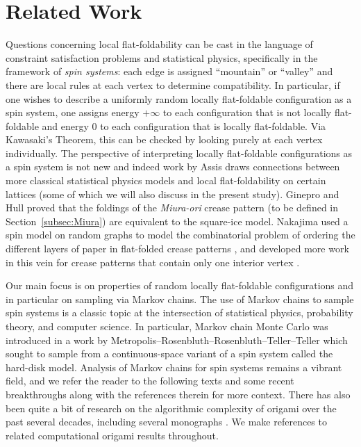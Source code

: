 \section{Related Work}
Questions concerning local flat-foldability can be cast in the language of constraint satisfaction problems and statistical physics, specifically in the framework of \emph{spin systems}: each edge is assigned ``mountain'' or ``valley'' and there are local rules at each vertex to determine compatibility.  In particular, if one wishes to describe a uniformly random locally flat-foldable configuration as a spin system, one assigns energy $+\infty$ to each configuration that is not locally flat-foldable and energy $0$ to each configuration that is locally flat-foldable.  Via Kawasaki's Theorem, this can be checked by looking purely at each vertex individually. The perspective of interpreting locally flat-foldable configurations as a spin system is not new and indeed work by Assis \cite{Assis} draws connections between more classical statistical physics models and local flat-foldability on certain lattices (some of which we will also discuss in the present study).
Ginepro and Hull \cite{Ginepro} proved that the foldings of the \textit{Miura-ori} crease pattern (to be defined in Section~\ref{subsec:Miura}) are equivalent to the square-ice model. 
Nakajima used a spin model on random graphs to model the combinatorial problem of ordering the different layers of paper in flat-folded crease patterns \cite{nakajima1}, and developed more work in this vein for crease patterns that contain only one interior vertex \cite{nakajima2}. 

Our main focus is on properties of random locally flat-foldable configurations and in particular on sampling via Markov chains.  The use of Markov chains to sample spin systems is a classic topic at the intersection of statistical physics, probability theory, and computer science.  In particular, Markov chain Monte Carlo was introduced in a work by Metropolis--Rosenbluth--Rosenbluth--Teller--Teller \cite{metropolis1953equation} which sought to sample from a continuous-space variant of a spin system called the hard-disk model.  Analysis of Markov chains for spin systems remains a vibrant field, and we refer the reader to the following texts \cite{grimmett2018probability, levin2017markov} and some recent breakthroughs \cite{anari2021spectral,chen2021optimal} along with the references therein for more context.
There has also been quite a bit of research on the algorithmic complexity of origami over the past several decades, including several monographs \cite{GFALOP,Origametry,Ida,Uehara1}. We make references to related computational origami results throughout.